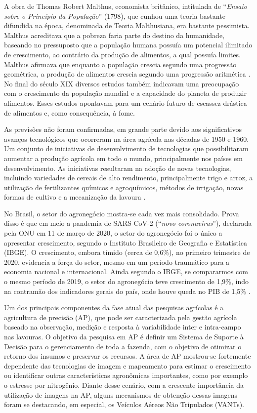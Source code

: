 \documentclass[12pt]{article}
\begin{document}
A obra de Thomas Robert Malthus, economista britânico, intitulada de ``\textit{Ensaio sobre o Princípio da População}'' (1798), que cunhou uma teoria bastante difundida na época, denominada de Teoria Malthusiana, era bastante pessimista. Malthus acreditava que a pobreza faria parte do destino da humanidade, baseando no pressuposto que a população humana possuía um potencial ilimitado de crescimento, ao contrário da produção de alimentos, a qual possuía limites. Malthus afirmava que enquanto a população crescia segundo uma progressão geométrica, a produção de alimentos crescia segundo uma progressão aritmética \cite{malthus1992malthus}. No final do século XIX diversos estudos também indicavam uma preocupação com o crescimento da população mundial e a capacidade do planeta de produzir alimentos. Esses estudos apontavam para um cenário futuro de escassez drástica de alimentos e, como consequência, à fome. 

As previsões não foram confirmadas, em grande parte devido aos significativos avanços tecnológicos que ocorreram na área agrícola nas décadas de 1950 e 1960. Um conjunto de iniciativas de desenvolvimento de tecnologias que possibilitaram aumentar a produção agrícola em todo o mundo, principalmente nos países em desenvolvimento. As iniciativas resultaram na adoção de novas tecnologias, incluindo variedades de cereais de alto rendimento, principalmente trigo e arroz, a utilização de fertilizantes químicos e agroquímicos, métodos de irrigação, novas formas de cultivo e a mecanização da lavoura \cite{malthus1872essay, hazell2009asian, farmer1986perspectives}. 

No Brasil, o setor do agronegócio mostra-se cada vez mais consolidado. Prova disso é que em meio a pandemia de SARS-CoV-2 (``\textit{novo coronavirus}''), declarada pela ONU em 11 de março de 2020, o setor do agronegócio foi o único a apresentar crescimento, segundo o Instituto Brasileiro de Geografia e Estatística (IBGE). O crescimento, embora tímido (cerca de 0,6\%), no primeiro trimestre de 2020, evidencia a força do setor, mesmo em um período traumático para a economia nacional e internacional. Ainda segundo o IBGE, se compararmos com o mesmo período de 2019, o setor do agronegócio teve crescimento de 1,9\%, indo na contramão dos indicadores gerais do país, onde houve queda no PIB de 1,5\% \cite{UNCovid,IBGE,IBGE2}.

Um dos principais componentes da fase atual das pesquisas agrícolas é a agricultura de precisão (AP), que pode ser caracterizada pela gestão agrícola baseado na observação, medição e resposta à variabilidade inter e intra-campo nas lavouras. O objetivo da pesquisa em AP é definir um Sistema de Suporte à Decisão para o gerenciamento de toda a fazenda, com o objetivo de otimizar o retorno dos insumos e preservar os recursos. A área de AP mostrou-se fortemente dependente das tecnologias de imagem e mapeamento para estimar o crescimento ou identificar outras características agronômicas importantes, como por exemplo o estresse por nitrogênio. Diante desse cenário, com a crescente importância da utilização de imagens na AP, alguns mecanismos de obtenção dessas imagens foram se destacando, em especial, os Veículos Aéreos Não Tripulados (VANTs).
\end{document}
